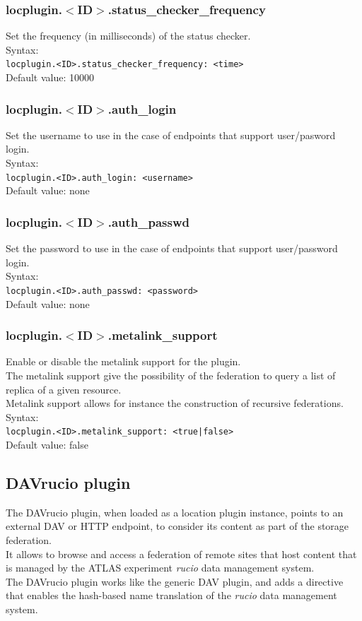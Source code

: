\documentclass[12pt]{article} %
\begin{document}
\subsubsection{locplugin.$<$ID$>$.status\_checker\_frequency}
Set the frequency (in milliseconds) of the status checker.\\
Syntax:\\
\lstinline"locplugin.<ID>.status_checker_frequency: <time>"\\
Default value: 10000\\
\subsubsection{locplugin.$<$ID$>$.auth\_login}
Set the username to use in the case of endpoints that support user/pasword login.\\
Syntax:\\
\lstinline"locplugin.<ID>.auth_login: <username>"\\
Default value: none\\
\subsubsection{locplugin.$<$ID$>$.auth\_passwd}
Set the password to use in the case of endpoints that support user/password login.\\
Syntax:\\
\lstinline"locplugin.<ID>.auth_passwd: <password>"\\
Default value: none\\
\subsubsection{locplugin.$<$ID$>$.metalink\_support}
Enable or disable the metalink support for the plugin. \\
The metalink support give the possibility of the federation to query a list of replica of a given resource. \\
Metalink support allows for instance the construction of recursive federations.  \\
Syntax:\\
\lstinline"locplugin.<ID>.metalink_support: <true|false>"\\
Default value: false \\


\subsection{DAVrucio plugin}
The DAVrucio plugin, when loaded as a location plugin instance, points to an external DAV or HTTP endpoint, to consider its content as part of the storage federation.\\
It allows to browse and access a federation of remote sites that host content that is managed by the ATLAS experiment \textit{rucio} data management system.\\
The DAVrucio plugin works like the generic DAV plugin, and adds a directive that enables the hash-based name translation of the \textit{rucio} data management system.\\
\end{document}
